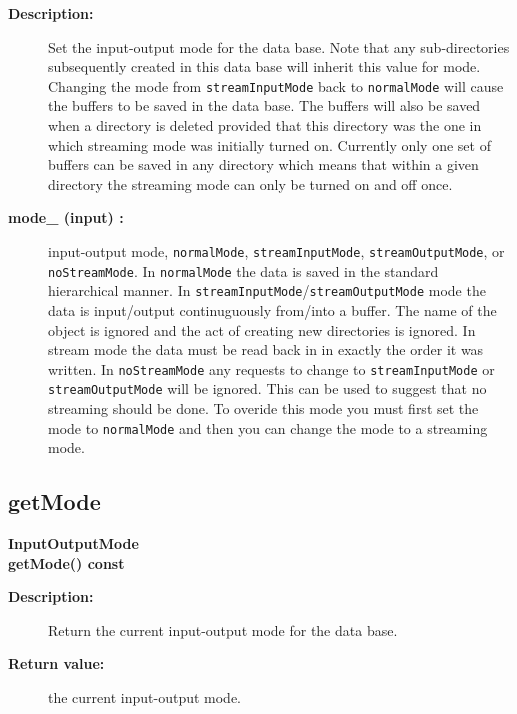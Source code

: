 \begin{description}
\item[{\bf Description:}] 
   Set the input-output mode for the data base. Note that any sub-directories subsequently
  created in this data base will inherit this value for mode. Changing the mode from
  {\tt streamInputMode} back to {\tt normalMode} will cause the
   buffers to be saved in the data base. The buffers will also be saved when a directory 
  is deleted provided that this directory was the one in which streaming mode was initially
   turned on.  Currently only one set of buffers can be saved
  in any directory which means that within a given directory the streaming mode can only
  be turned on and off once.
     
\item[{\bf mode\_ (input) :}]  input-output mode, {\tt normalMode}, {\tt streamInputMode}, 
  {\tt streamOutputMode}, or {\tt noStreamMode}. In {\tt normalMode} the data is saved in the standard
   hierarchical manner. In {\tt streamInputMode}/{\tt streamOutputMode} mode the
   data is input/output continuguously from/into a buffer. The name of the object is ignored and
   the act of creating new directories is ignored. In stream mode the data must be read back 
   in in exactly the order it was written. In {\tt noStreamMode}
   any requests to change to  {\tt streamInputMode} or {\tt streamOutputMode} will be ignored. This can
   be used to suggest that no streaming should be done. To overide this mode you must first set the
   mode to {\tt normalMode} and then you can change the mode to a streaming mode.

\end{description}
\subsection{getMode}
 
\begin{flushleft} \textbf{%
InputOutputMode  \\ 
\settowidth{\GenericDataBaseIncludeArgIndent}{getMode(}%
getMode() const
}\end{flushleft}
    
\begin{description}
\item[{\bf Description:}] 
   Return the current input-output mode for the data base.

\item[{\bf Return value:}]  the current input-output mode.
\end{description}
